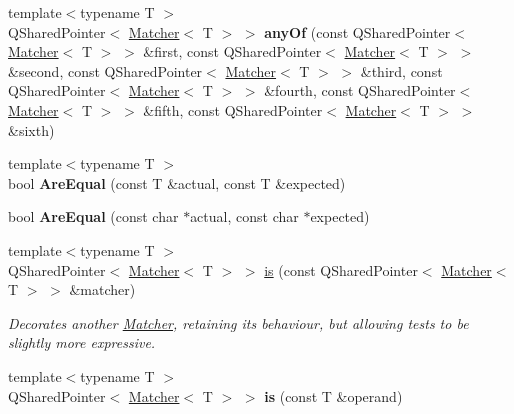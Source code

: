\begin{DoxyCompactItemize}
\item 
\hypertarget{namespace_hamcrest_qt_ab08811fbd4164f6ca3b700b48f528e1e}{{\footnotesize template$<$typename T $>$ }\\Q\-Shared\-Pointer$<$ \hyperlink{class_hamcrest_qt_1_1_matcher}{Matcher}$<$ T $>$ $>$ {\bfseries any\-Of} (const Q\-Shared\-Pointer$<$ \hyperlink{class_hamcrest_qt_1_1_matcher}{Matcher}$<$ T $>$ $>$ \&first, const Q\-Shared\-Pointer$<$ \hyperlink{class_hamcrest_qt_1_1_matcher}{Matcher}$<$ T $>$ $>$ \&second, const Q\-Shared\-Pointer$<$ \hyperlink{class_hamcrest_qt_1_1_matcher}{Matcher}$<$ T $>$ $>$ \&third, const Q\-Shared\-Pointer$<$ \hyperlink{class_hamcrest_qt_1_1_matcher}{Matcher}$<$ T $>$ $>$ \&fourth, const Q\-Shared\-Pointer$<$ \hyperlink{class_hamcrest_qt_1_1_matcher}{Matcher}$<$ T $>$ $>$ \&fifth, const Q\-Shared\-Pointer$<$ \hyperlink{class_hamcrest_qt_1_1_matcher}{Matcher}$<$ T $>$ $>$ \&sixth)}\label{namespace_hamcrest_qt_ab08811fbd4164f6ca3b700b48f528e1e}

\item 
\hypertarget{namespace_hamcrest_qt_a1a99fe898b2b85cb0a249123a44b3b6f}{{\footnotesize template$<$typename T $>$ }\\bool {\bfseries Are\-Equal} (const T \&actual, const T \&expected)}\label{namespace_hamcrest_qt_a1a99fe898b2b85cb0a249123a44b3b6f}

\item 
\hypertarget{namespace_hamcrest_qt_ae0acf05b2fd0a342d222bd30f9d82799}{bool {\bfseries Are\-Equal} (const char $\ast$actual, const char $\ast$expected)}\label{namespace_hamcrest_qt_ae0acf05b2fd0a342d222bd30f9d82799}

\item 
{\footnotesize template$<$typename T $>$ }\\Q\-Shared\-Pointer$<$ \hyperlink{class_hamcrest_qt_1_1_matcher}{Matcher}$<$ T $>$ $>$ \hyperlink{namespace_hamcrest_qt_af2c85daf497047f4891285dd0a86f7f1}{is} (const Q\-Shared\-Pointer$<$ \hyperlink{class_hamcrest_qt_1_1_matcher}{Matcher}$<$ T $>$ $>$ \&matcher)
\begin{DoxyCompactList}\small\item\em Decorates another \hyperlink{class_hamcrest_qt_1_1_matcher}{Matcher}, retaining its behaviour, but allowing tests to be slightly more expressive. \end{DoxyCompactList}\item 
\hypertarget{namespace_hamcrest_qt_a45dcba83f740365cbd95c2ea06ac2a3f}{{\footnotesize template$<$typename T $>$ }\\Q\-Shared\-Pointer$<$ \hyperlink{class_hamcrest_qt_1_1_matcher}{Matcher}$<$ T $>$ $>$ {\bfseries is} (const T \&operand)}\label{namespace_hamcrest_qt_a45dcba83f740365cbd95c2ea06ac2a3f}


\end{DoxyCompactItemize}
